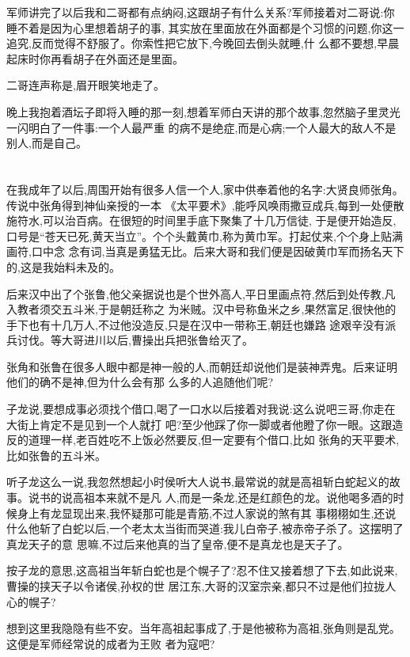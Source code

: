 ﻿\documentclass[12pt,twocolumn]{article}
\begin{document}
军师讲完了以后我和二哥都有点纳闷,这跟胡子有什么关系?军师接着对二哥说:你睡不着是因为心里想着胡子的事,
其实放在里面放在外面都是个习惯的问题,你这一追究,反而觉得不舒服了。你索性把它放下,今晚回去倒头就睡,什
么都不要想,早晨起床时你再看胡子在外面还是里面。

二哥连声称是,眉开眼笑地走了。

晚上我抱着酒坛子即将入睡的那一刻,想着军师白天讲的那个故事,忽然脑子里灵光一闪明白了一件事:一个人最严重
的病不是绝症,而是心病;一个人最大的敌人不是别人,而是自己。

\section{}

在我成年了以后,周围开始有很多人信一个人,家中供奉着他的名字:大贤良师张角。传说中张角得到神仙亲授的一本
《太平要术》,能呼风唤雨撒豆成兵,每到一处便散施符水,可以治百病。在很短的时间里手底下聚集了十几万信徒,
于是便开始造反,口号是``苍天已死,黄天当立''。个个头戴黄巾,称为黄巾军。打起仗来,个个身上贴满画符,口中念
念有词,当真是勇猛无比。后来大哥和我们便是因破黄巾军而扬名天下的,这是我始料未及的。

后来汉中出了个张鲁,他父亲据说也是个世外高人,平日里画点符,然后到处传教,凡入教者须交五斗米,于是朝廷称之
为米贼。汉中号称鱼米之乡,果然富足,很快他的手下也有十几万人,不过他没造反,只是在汉中一带称王,朝廷也嫌路
途艰辛没有派兵讨伐。等大哥进川以后,曹操出兵把张鲁给灭了。

张角和张鲁在很多人眼中都是神一般的人,而朝廷却说他们是装神弄鬼。后来证明他们的确不是神,但为什么会有那
么多的人追随他们呢?

子龙说,要想成事必须找个借口,喝了一口水以后接着对我说:这么说吧三哥,你走在大街上肯定不是见到一个人就打
吧?至少他踩了你一脚或者他瞪了你一眼。这跟造反的道理一样,老百姓吃不上饭必然要反,但一定要有个借口,比如
张角的天平要术,比如张鲁的五斗米。

听子龙这么一说,我忽然想起小时侯听大人说书,最常说的就是高祖斩白蛇起义的故事。说书的说高祖本来就不是凡
人,而是一条龙,还是红颜色的龙。说他喝多酒的时候身上有龙显现出来,我怀疑那可能是青筋,不过人家说的煞有其
事栩栩如生,还说什么他斩了白蛇以后,一个老太太当街而哭道:我儿白帝子,被赤帝子杀了。这摆明了真龙天子的意
思嘛,不过后来他真的当了皇帝,便不是真龙也是天子了。

按子龙的意思,这高祖当年斩白蛇也是个幌子了?忍不住又接着想了下去,如此说来,曹操的挟天子以令诸侯,孙权的世
居江东,大哥的汉室宗亲,都只不过是他们拉拢人心的幌子?

想到这里我隐隐有些不安。当年高祖起事成了,于是他被称为高祖,张角则是乱党。这便是军师经常说的成者为王败
者为寇吧?
\end{document}
